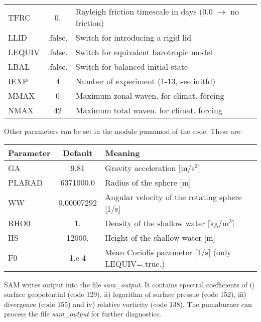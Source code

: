 \begin{tabular}{|l|c|l|}
TFRC     &  0.      & Rayleigh friction timescale in days (0.0 $\rightarrow$  no friction)\\
LLID     & .false.  & Switch for introducing a rigid lid\\
LEQUIV   & .false.  & Switch for equivalent barotropic model\\
LBAL     & .false.  & Switch for balanced initial state\\
IEXP     & 4        & Number of experiment (1-13, see initfd)\\
MMAX     & 0        & Maximum zonal waven. for climat. forcing     \\
NMAX     & 42       & Maximum total waven. for climat. forcing     \\
\hline
\end{tabular}

Other parameters can be set in the module pumamod of the code. These are:
\begin{tabular}{|l|c|l|}
\hline
Parameter & Default & Meaning\\
\hline
GA       & 9.81       & Gravity acceleration [m/s$^2$]\\
PLARAD   & 6371000.0  & Radius of the sphere [m]\\
WW       & 0.00007292 & Angular velocity of the rotating sphere [1/s]\\
RHO0     & 1.         & Density of the shallow water [kg/m$^3$]\\ 
HS       & 12000.     & Height of the shallow water [m]\\
F0       & 1.e-4      & Mean Coriolis parameter [1/s] (only LEQUIV=.true.)\\
\hline
\end{tabular}

SAM writes output into the file {\it sam\_output}. It contains
spectral coefficients of i) surface geopotential 
(code 129), ii) logarithm of surface pressue (code 152),
iii) divergence (code 155) and iv) relative vorticity (code 138). 
The pumaburner 
can process the file  {\it sam\_output} for further diagnostics.

 


